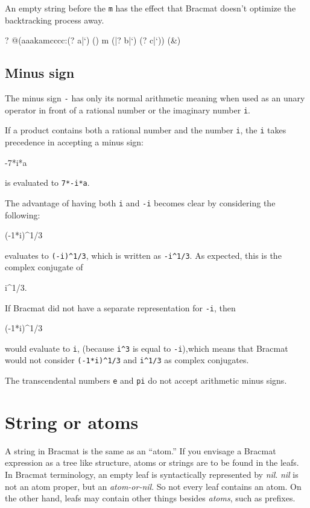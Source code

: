 \documentclass[12pt]{article}
\begin{document}
An empty string before the \verb|m| has the effect that Bracmat
doesn't optimize the backtracking process away.
\begin{ex}
{?} @(aaakamcccc:(? a|`) () m (|? b|`) (? c|`)) (&)
\end{ex}

\subsection{Minus sign}

The minus sign \verb|-| has only its normal arithmetic meaning when
used as an unary operator in front of a rational number or the
imaginary number \verb|i|.

If a product contains both a rational number and the number \verb|i|,
the \verb|i| takes precedence in accepting a minus sign:
\begin{v}
-7*i*a
\end{v}
is evaluated to \verb|7*-i*a|.

The advantage of having both \verb|i| and \verb|-i| becomes clear by
considering the following:
\begin{v}
(-1*i)^1/3
\end{v}
evaluates to \verb|(-i)^1/3|, which is written as \verb|-i^1/3|. As
expected, this is the complex conjugate of
\begin{v}
i^1/3.
\end{v}

If Bracmat did not have a separate representation for \verb|-i|, then
\begin{v}
(-1*i)^1/3
\end{v}
would evaluate to \verb|i|, (because \verb|i^3| is equal to
\verb|-i|),which means that Bracmat would not consider
\verb|(-1*i)^1/3| and \verb|i^1/3| as complex conjugates.

The transcendental numbers \verb|e| and \verb|pi| do not accept
arithmetic minus signs.

\section{String or atoms}

A string in Bracmat is the same as an ``atom.'' If you envisage a
Bracmat expression as a tree like structure, atoms or strings are to
be found in the leafs. In Bracmat terminology, an empty leaf is
syntactically represented by \emph{nil}. \emph{nil} is not an atom
proper, but an \emph{atom-or-nil}. So not every leaf contains an
atom. On the other hand, leafs may contain other things besides
\emph{atoms}, such as prefixes.
\end{document}
